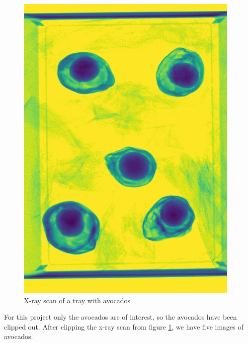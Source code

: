 \documentclass[11pt]{article}
\begin{document}
\begin{figure}[!h]
    \centering
    \includegraphics[scale=0.3]{figurer/data/avo_tray.jpg}
    \caption{X-ray scan of a tray with avocados}
    \label{fig:data_avo_tray}
\end{figure}

For this project only the avocados are of interest, so the avocados have been clipped out. After clipping the x-ray scan from figure \ref{fig:data_avo_tray}, we have five images of avocados.
\end{document}
